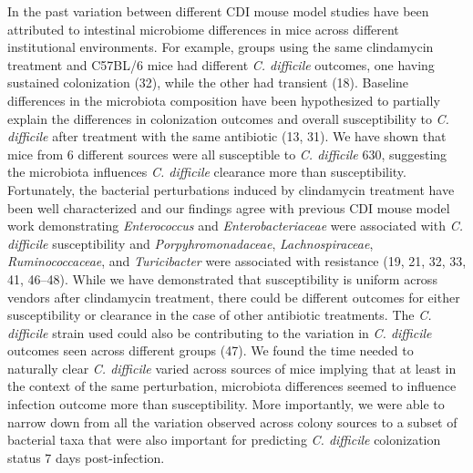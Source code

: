 \documentclass[11pt,]{article}
\begin{document}
In the past variation between different CDI mouse model studies have
been attributed to intestinal microbiome differences in mice across
different institutional environments. For example, groups using the same
clindamycin treatment and C57BL/6 mice had different \emph{C. difficile}
outcomes, one having sustained colonization (32), while the other had
transient (18). Baseline differences in the microbiota composition have
been hypothesized to partially explain the differences in colonization
outcomes and overall susceptibility to \emph{C. difficile} after
treatment with the same antibiotic (13, 31). We have shown that mice
from 6 different sources were all susceptible to \emph{C. difficile}
630, suggesting the microbiota influences \emph{C. difficile} clearance
more than susceptibility. Fortunately, the bacterial perturbations
induced by clindamycin treatment have been well characterized and our
findings agree with previous CDI mouse model work demonstrating
\emph{Enterococcus} and \emph{Enterobacteriaceae} were associated with
\emph{C. difficile} susceptibility and \emph{Porpyhromonadaceae},
\emph{Lachnospiraceae}, \emph{Ruminococcaceae}, and \emph{Turicibacter}
were associated with resistance (19, 21, 32, 33, 41, 46--48). While we
have demonstrated that susceptibility is uniform across vendors after
clindamycin treatment, there could be different outcomes for either
susceptibility or clearance in the case of other antibiotic treatments.
The \emph{C. difficile} strain used could also be contributing to the
variation in \emph{C. difficile} outcomes seen across different groups
(47). We found the time needed to naturally clear \emph{C. difficile}
varied across sources of mice implying that at least in the context of
the same perturbation, microbiota differences seemed to influence
infection outcome more than susceptibility. More importantly, we were
able to narrow down from all the variation observed across colony
sources to a subset of bacterial taxa that were also important for
predicting \emph{C. difficile} colonization status 7 days
post-infection.
\end{document}
